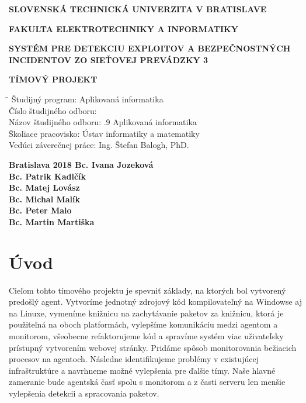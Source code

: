 \documentclass[a4paper,12pt]{article}
\begin{document}
\begin{titlepage}
	\centering
	
	{\bfseries SLOVENSKÁ TECHNICKÁ UNIVERZITA  V BRATISLAVE\par}
	{\bfseries FAKULTA ELEKTROTECHNIKY A INFORMATIKY\par}
	\vspace{8cm}
	{\bfseries SYSTÉM PRE DETEKCIU EXPLOITOV A BEZPEČNOSTNÝCH INCIDENTOV ZO SIEŤOVEJ PREVÁDZKY 3\par}
	\vspace{0.5cm}
	{\bfseries TÍMOVÝ PROJEKT\par}
	
	\vspace{\fill}
	\begin{tabbing}
		\hspace*{5cm}\= \kill
		Študijný program: \> Aplikovaná informatika \\
		Číslo študijného odboru:  \\
		Názov študijného odboru: .9 Aplikovaná informatika \\
		Školiace pracovisko: \> Ústav informatiky a matematiky \\
		Vedúci záverečnej práce: \> Ing. Štefan Balogh, PhD. \\
	\end{tabbing}
	\vspace{\fill}
	
	{\bfseries Bratislava 2018 	\hfill \bfseries {Bc. Ivana Jozeková}} \\
	{ \hfill \bfseries {Bc. Patrik Kadlčík}} \\
	{ \hfill \bfseries {Bc. Matej Lovász}} \\
	{ \hfill \bfseries {Bc. Michal Malík}} \\ 
	{ \hfill \bfseries {Bc. Peter Malo}} \\
	{ \hfill \bfseries {Bc. Martin Martiška}}
	
\end{titlepage}
\newpage

\renewcommand{\contentsname}{Obsah}
\tableofcontents
\newpage
\renewcommand{\listfigurename}{Zoznam obrázkov}
\listoffigures
\newpage


\section*{Úvod}
\setcounter{page}{1}
\pagestyle{plain}
Cieľom tohto tímového projektu je spevniť základy, na ktorých bol vytvorený predošlý agent. Vytvoríme jednotný zdrojový kód kompilovateľný na Windowse aj na Linuxe, vymeníme knižnicu na zachytávanie paketov za knižnicu, ktorá je použiteľná na oboch platformách, vylepšíme komunikáciu medzi agentom a monitorom, všeobecne refaktorujeme kód a spravíme systém viac uživateľsky prístupný vytvorením webovej stránky. Pridáme spôsob monitorovania bežiacich procesov na agentoch. Následne identifikujeme problémy v existujúcej infraštruktúre a navrhneme možné vylepšenia pre ďalšie tímy. Naše hlavné zameranie bude agentská časť spolu s monitorom a z časti serveru len menšie vylepšenia detekcii a spracovania paketov. \\
\newpage
\end{document}
